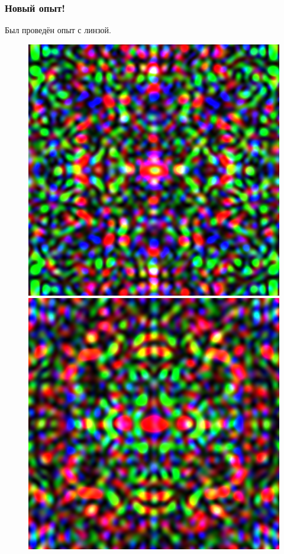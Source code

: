 \documentclass{beamer}
\begin{document}
\begin{frame}
  \frametitle{Новый опыт!}

  Был проведён опыт с линзой. 
  \begin{figure}[c]
    \includegraphics[scale=0.3]{assets/len1.png}
    \includegraphics[scale=0.3]{assets/len2.png}
  \end{figure}
\end{frame}
\end{document}
